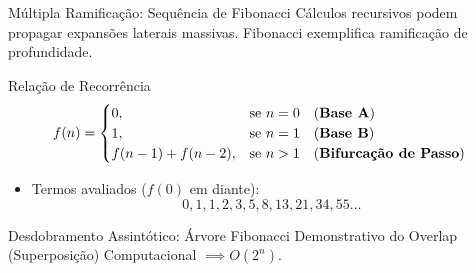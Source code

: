 \documentclass{beamer}
\begin{document}
\begin{frame}{Múltipla Ramificação: Sequência de Fibonacci}
Cálculos recursivos podem propagar expansões laterais massivas. Fibonacci exemplifica ramificação de profundidade.

\vspace{0.2cm}
\begin{block}{Relação de Recorrência}
  \begin{equation*}
   f(n) =
    \begin{cases}
      0, & \text{se } n = 0 \quad \text{(\textbf{Base A})}  \\
      1, & \text{se } n = 1 \quad \text{(\textbf{Base B})}  \\
      f(n-1) + f(n-2), & \text{se } n > 1 \quad \text{(\textbf{Bifurcação de Passo})}
    \end{cases}        
  \end{equation*}
\end{block}
\pause
\begin{itemize}
  \item Termos avaliados ($f(0)$ em diante):
  $$0, 1, 1, 2, 3, 5, 8, 13, 21, 34, 55 \dots$$
\end{itemize}
\end{frame}

\begin{frame}{Desdobramento Assintótico: Árvore Fibonacci}
Demonstrativo do Overlap (Superposição) Computacional $\implies O(2^n)$.
\vspace{0.3cm}
\begin{center}
\end{center}

\end{frame}
\end{document}
